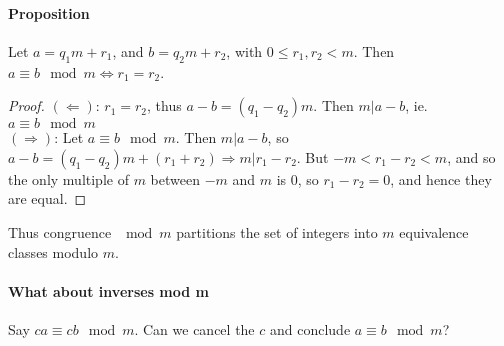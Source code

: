 \documentclass[10pt,letter]{article}
\theoremstyle{plain}
\theoremstyle{definition}
\begin{document}
\paragraph{Proposition}
Let $a=q_1m+r_1$, and $b=q_2m+r_2$, with $0\leq r_1,r_2<m$. Then $a\equiv b\mod{m}\Leftrightarrow r_1=r_2$. \begin{proof}
$(\Leftarrow)$: $r_1=r_2$, thus $a-b=(q_1-q_2)m$. Then $m|a-b$, ie. $a\equiv b\mod{m}$ \\ 
$(\Rightarrow)$: Let $a\equiv b\mod{m}$. Then $m|a-b$, so $a-b=(q_1-q_2)m+(r_1+r_2)\Rightarrow m|r_1-r_2$. But $-m<r_1-r_2<m$, and so the only multiple of $m$ between $-m$ and $m$ is $0$, so $r_1-r_2=0$, and hence they are equal. 
\end{proof}
Thus congruence $\mod{m}$ partitions the set of integers into $m$ equivalence classes modulo $m$.  

\paragraph{What about inverses mod m}
Say $ca\equiv cb\mod{m}$. Can we cancel the $c$ and conclude $a\equiv b\mod{m}$? 
\end{document}
